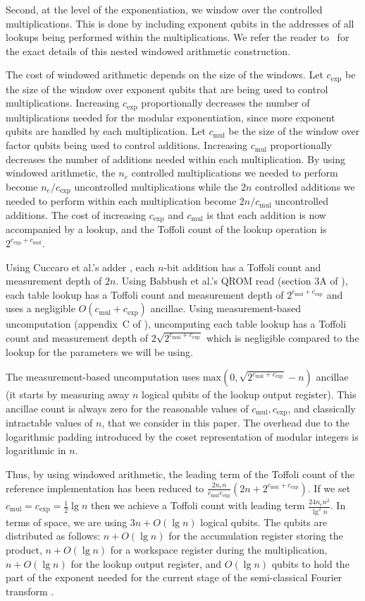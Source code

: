 \documentclass[a4paper, onecolumn, accepted=2021-03-29]{quantumarticle}
\newcommand{\lenexp}{{n_e}}
\newcommand{\gexp}{{c_{\text{exp}}}}
\newcommand{\gmul}{{c_{\text{mul}}}}
\begin{document}
Second, at the level of the exponentiation, we window over the controlled multiplications.
This is done by including exponent qubits in the addresses of all lookups being performed within the multiplications.
We refer the reader to~\cite{gidney2019windowedarithmetic} for the exact details of this nested windowed arithmetic construction.

The cost of windowed arithmetic depends on the size of the windows.
Let $\gexp$ be the size of the window over exponent qubits that are being used to control multiplications.
Increasing $\gexp$ proportionally decreases the number of multiplications needed for the modular exponentiation, since more exponent qubits are handled by each multiplication.
Let $\gmul$ be the size of the window over factor qubits being used to control additions.
Increasing $\gmul$ proportionally decreases the number of additions needed within each multiplication.
By using windowed arithmetic, the $\lenexp$ controlled multiplications we needed to perform become $\lenexp / \gexp$ uncontrolled multiplications while the $2 n$ controlled additions we needed to perform within each multiplication become $2 n / \gmul$ uncontrolled additions.
The cost of increasing $\gexp$ and $\gmul$ is that each addition is now accompanied by a lookup, and the Toffoli count of the lookup operation is $2^{\gexp + \gmul}$.

Using Cuccaro et al.'s adder \cite{cuccaro2004adder}, each $n$-bit addition has a Toffoli count and measurement depth of $2n$.
Using Babbush et al.'s QROM read (section 3A of \cite{babbush2018}), each table lookup has a Toffoli count and measurement depth of $2^{\gmul+\gexp}$ and uses a negligible $O(\gmul + \gexp)$ ancillae.
Using measurement-based uncomputation (appendix~C of \cite{berry2019qubitization}), uncomputing each table lookup has a Toffoli count and measurement depth of $2 \sqrt{2^{\gmul + \gexp}}$ which is negligible compared to the lookup for the parameters we will be using.

The measurement-based uncomputation uses $\text{max}(0, \sqrt{2^{\gmul + \gexp}} - n)$ ancillae (it starts by measuring away $n$ logical qubits of the lookup output register).
This ancillae count is always zero for the reasonable values of $\gmul, \gexp$, and classically intractable values of $n$, that we consider in this paper.
The overhead due to the logarithmic padding introduced by the coset representation of modular integers is logarithmic in $n$.

Thus, by using windowed arithmetic, the leading term of the Toffoli count of the reference implementation has been reduced to $\frac{2 \lenexp n}{\gmul \gexp} (2n + 2^{\gmul + \gexp})$.
If we set $\gmul = \gexp = \frac{1}{2} \lg n$ then we achieve a Toffoli count with leading term $\frac{24 \lenexp n^2}{\lg^2 n}$.
In terms of space, we are using $3n + O(\lg n)$ logical qubits.
The qubits are distributed as follows:
  $n+O(\lg n)$ for the accumulation register storing the product,
  $n+O(\lg n)$ for a workspace register during the multiplication,
  $n + O(\lg n)$ for the lookup output register,
  and $O(\lg n)$ qubits to hold the part of the exponent needed for the current stage of the semi-classical Fourier transform \cite{griffiths1996semiclassical}.
\end{document}
